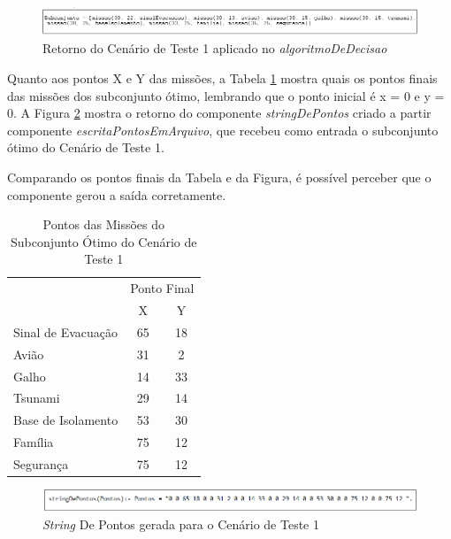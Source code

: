 \FloatBarrier
\begin{figure}[!h]
\centering
\includegraphics[keepaspectratio=true,scale=0.7]{figuras/resultado1.png}
\caption{Retorno do Cenário de Teste 1 aplicado no \textit{algoritmoDeDecisao}}
\label{resultado1}
\end{figure}
 

Quanto aos pontos X e Y das missões, a Tabela \ref{pontoCT1} mostra quais os pontos finais das missões dos subconjunto ótimo, lembrando que o ponto inicial é x = 0 e y = 0. A Figura \ref{stringCT1} mostra o retorno do componente \textit{stringDePontos} criado a partir componente \textit{escritaPontosEmArquivo}, que recebeu como entrada o subconjunto ótimo do Cenário de Teste 1. 

Comparando os pontos finais da Tabela e da Figura, é possível perceber que o componente gerou a saída corretamente.


\begin{table}[!h]
\centering
\caption{Pontos das Missões do Subconjunto Ótimo do Cenário de Teste 1}
\label{pontoCT1}
\begin{tabular}{lcc}
\rowcolor[HTML]{00D2CB} 
\multicolumn{1}{c}{\cellcolor[HTML]{00D2CB}} & \multicolumn{2}{l}{\cellcolor[HTML]{00D2CB}Ponto Final} \\ 
\rowcolor[HTML]{C0F2F0} 
\multicolumn{1}{c}{\cellcolor[HTML]{00D2CB}Missão} & \multicolumn{1}{c}{\cellcolor[HTML]{C0F2F0}X} & \multicolumn{1}{c}{\cellcolor[HTML]{C0F2F0}Y} \\
 Sinal de Evacuação & 65 & 18 \\
 Avião & 31 & 2 \\
 Galho & 14 & 33 \\
 Tsunami & 29 & 14 \\
 Base de Isolamento & 53 & 30 \\
 Família & 75 & 12 \\
 Segurança & 75 & 12    \\          
\end{tabular}
\end{table}


\FloatBarrier
\begin{figure}[!h]
\centering
\includegraphics[keepaspectratio=true,scale=0.7]{figuras/stringCT1.png}
\caption{\textit{String} De Pontos gerada para o Cenário de Teste 1}
\label{stringCT1}
\end{figure}



